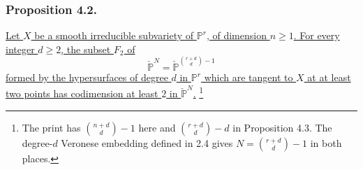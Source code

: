 \subsubsection*{Proposition 4.2.}
\underline{Let $X$ be a smooth irreducible subvariety of
$\mathbb P^r$, of dimension $n\geq1$.  For every integer $d\geq2$,
the subset $F_2$ of}
\[
\check{\mathbb P}^{N}
=\check{\mathbb P}^{\binom{r+d}{d}-1}
\]
\underline{formed by the hypersurfaces of degree $d$ in
$\mathbb P^r$ which are tangent to $X$ at at least two points has
codimension at least $2$ in $\check{\mathbb P}^{N}$.}
\footnote{The print has $\binom{n+d}{d}-1$ here and
$\binom{r+d}{d}-d$ in Proposition 4.3.  The degree-$d$ Veronese
embedding defined in 2.4 gives
$N=\binom{r+d}{d}-1$ in both places.}
